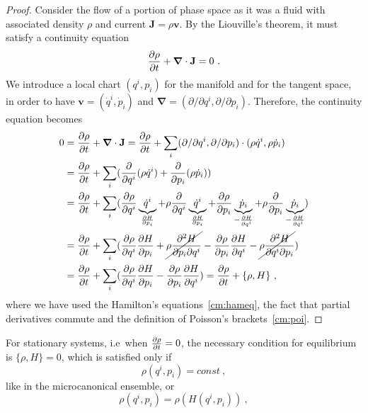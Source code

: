     \begin{proof}
        Consider the flow of a portion of phase space as it was a fluid with associated density $\rho$ and current $\mathbf J = \rho \mathbf v$. By the Liouville's theorem, it must satisfy a continuity equation 
        \begin{equation*}
            \frac{\partial\rho}{\partial t} + \boldsymbol \nabla \cdot \mathbf J = 0 ~.
        \end{equation*}
        We introduce a local chart $(q^i, p_i)$ for the manifold and for the tangent space, in order to have $\mathbf v = (\dot q^i, \dot p_i)$ and $\boldsymbol \nabla = (\partial/\partial q^i, \partial/\partial p_i)$. Therefore, the continuity equation becomes
        \begin{equation*}
        \begin{aligned}
            0 & = \frac{\partial\rho}{\partial t} + \boldsymbol \nabla \cdot \mathbf J = \frac{\partial\rho}{\partial t} + \sum_i (\partial/\partial q^i, \partial/\partial p_i) \cdot (\rho \dot q^i, \rho \dot p_i) \\ & = \frac{\partial\rho}{\partial t} + \sum_i ( \frac{\partial}{\partial q^i} (\rho \dot q^i) + \frac{\partial}{\partial p_i} (\rho \dot p_i) ) \\ & = \frac{\partial\rho}{\partial t} + \sum_i ( \frac{\partial\rho}{\partial q^i} \underbrace{\dot q^i}_{\frac{\partial H}{\partial p_i}} + \rho \frac{\partial}{\partial q^i} \underbrace{\dot q^i}_{\frac{\partial H}{\partial p_i}} + \frac{\partial\rho}{\partial p_i} \underbrace{\dot p_i}_{-\frac{\partial H}{\partial q^i}} + \rho \frac{\partial}{\partial p_i} \underbrace{\dot p_i}_{-\frac{\partial H}{\partial q^i}} ) \\ & = \frac{\partial\rho}{\partial t} + \sum_i ( \frac{\partial\rho}{\partial q^i} \frac{\partial H}{\partial p_i} + \cancel{\rho \frac{\partial^2 H}{\partial p_i \partial q^i}} - \frac{\partial\rho}{\partial p_i} \frac{\partial H}{\partial q^i} - \cancel{\rho \frac{\partial^2 H}{\partial q^i \partial p_i}} ) \\ & = \frac{\partial\rho}{\partial t} + \sum_i ( \frac{\partial\rho}{\partial q^i} \frac{\partial H}{\partial p_i} - \frac{\partial\rho}{\partial p_i} \frac{\partial H}{\partial q^i} ) = \frac{\partial\rho}{\partial t} + \{\rho, H\} ~,
        \end{aligned}
        \end{equation*}
        where we have used the Hamilton's equations~\eqref{cm:hameq}, the fact that partial derivatives commute and the definition of Poisson's brackets~\eqref{cm:poi}.
    \end{proof}
    For stationary systems, i.e~when $\frac{\partial\rho}{\partial t} = 0$, the necessary condition for equilibrium is $\{\rho, H\} = 0$, which is satisfied only if 
    \begin{equation}\label{cm:rc}
        \rho(q^i, p_i) = const ~,
    \end{equation}
    like in the microcanonical ensemble, or 
    \begin{equation}\label{cm:rh}
        \rho(q^i, p_i) = \rho(H(q^i,p_i)) ~,
    \end{equation}
